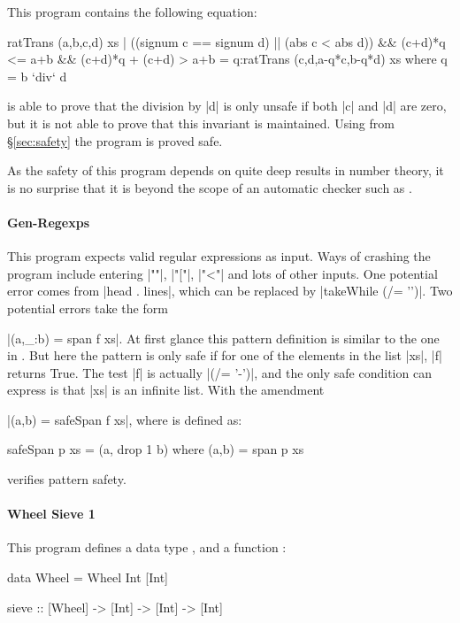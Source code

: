This program contains the following equation:

\begin{code}
ratTrans (a,b,c,d) xs |
  ((signum c == signum d) || (abs c < abs d)) &&
  (c+d)*q <= a+b && (c+d)*q + (c+d) > a+b
     = q:ratTrans (c,d,a-q*c,b-q*d) xs
  where q = b `div` d
\end{code}

\noindent \catch{} is able to prove that the division by |d| is only unsafe if both |c| and |d| are zero, but it is not able to prove that this invariant is maintained. Using  from \S\ref{sec:safety} the program is proved safe.

As the safety of this program depends on quite deep results in number theory, it is no surprise that it is beyond the scope of an automatic checker such as \catch{}.

\paragraph{Gen-Regexps}

This program expects valid regular expressions as input. Ways of crashing the program include entering |""|, |"["|, |"<"| and lots of other inputs. One potential error comes from |head . lines|, which can be replaced by |takeWhile (/= '\n')|. Two potential errors take the form \ignore|(a,_:b) = span f xs|. At first glance this pattern definition is similar to the one in . But here the pattern is only safe if for one of the elements in the list |xs|, |f| returns True. The test |f| is actually |(/= '-')|, and the only safe condition \catch{} can express is that |xs| is an infinite list. With the amendment  \ignore|(a,b) = safeSpan f xs|, where  is defined as:

\begin{code}
safeSpan p xs = (a, drop 1 b) where (a,b) = span p xs
\end{code}

\noindent \catch{} verifies pattern safety.

\paragraph{Wheel Sieve 1}

This program defines a data type , and a function :

\begin{code}
data Wheel = Wheel Int [Int]

sieve :: [Wheel] -> [Int] -> [Int] -> [Int]
\end{code}

